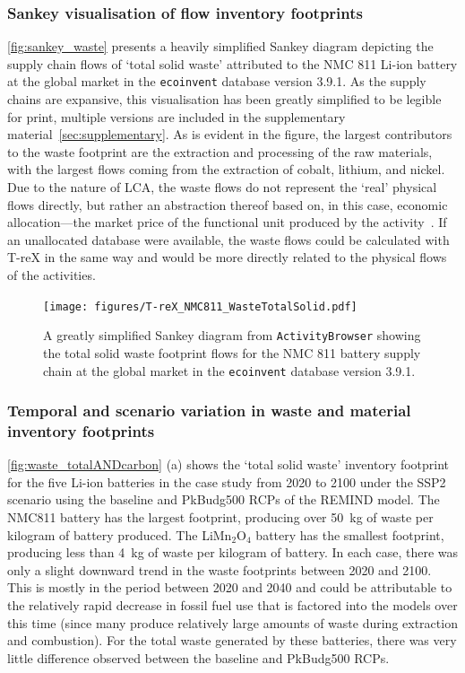 \documentclass[a4paper,fleqn,longmktitle]{cas-dc}
\begin{document}
\subsubsection{Sankey visualisation of flow inventory footprints}\label{sec:results-case_study-sankey}

\autoref{fig:sankey_waste} presents a heavily simplified Sankey diagram depicting the supply chain flows of `total solid waste' attributed to the NMC 811 Li-ion battery at the global market in the \texttt{ecoinvent} database version 3.9.1. As the supply chains are expansive, this visualisation has been greatly simplified to be legible for print, multiple versions are included in the supplementary material~\autoref{sec:supplementary}. As is evident in the figure, the largest contributors to the waste footprint are the extraction and processing of the raw materials, with the largest flows coming from the extraction of cobalt, lithium, and nickel. Due to the nature of LCA, the waste flows do not represent the `real' physical flows directly, but rather an abstraction thereof based on, in this case, economic allocation---the market price of the functional unit produced by the activity~\citep{guinee2004economicallocation}. If an unallocated database were available, the waste flows could be calculated with T-reX in the same way and would be more directly related to the physical flows of the activities.

\begin{figure}[H]
    \centering
    \texttt{[image: figures/T-reX\_NMC811\_WasteTotalSolid.pdf]}
    \caption{A greatly simplified Sankey diagram from \texttt{ActivityBrowser} showing the total solid waste footprint flows for the NMC 811 battery supply chain at the global market in the \texttt{ecoinvent} database version 3.9.1.}\label{fig:sankey_waste}
\end{figure}

\subsubsection{Temporal and scenario variation in waste and material inventory footprints}

\autoref{fig:waste_totalANDcarbon} (a) shows the `total solid waste' inventory footprint for the five Li-ion batteries in the case study from 2020 to 2100 under the SSP2 scenario using the baseline and PkBudg500 RCPs of the REMIND model. The NMC811 battery has the largest footprint, producing over 50~kg of waste per kilogram of battery produced. The  LiMn\(_2\)O\(_4\) battery has the smallest footprint, producing less than 4~kg of waste per kilogram of battery. In each case, there was only a slight downward trend in the waste footprints between 2020 and 2100. This is mostly in the period between 2020 and 2040 and could be attributable to the relatively rapid decrease in fossil fuel use that is factored into the models over this time (since many produce relatively large amounts of waste during extraction and combustion). For the total waste generated by these batteries, there was very little difference observed between the baseline and PkBudg500 RCPs.
\end{document}

